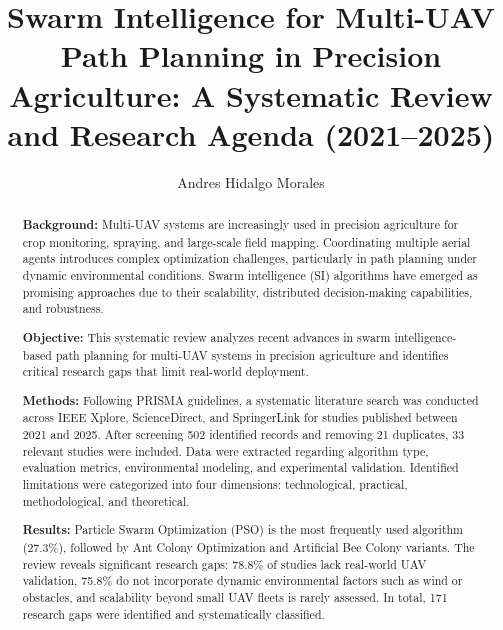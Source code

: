 \documentclass[review,3p,times]{elsarticle}
\begin{document}
\begin{frontmatter}

\title{Swarm Intelligence for Multi-UAV Path Planning in Precision Agriculture: A Systematic Review and Research Agenda (2021--2025)}

\author{\texorpdfstring{Andres Hidalgo Morales}{Andres Hidalgo Morales}}

\address{Instituto Tecnológico de Chihuahua II, Tecnológico Nacional de México, Chihuahua, México}

\begin{abstract}
\textbf{Background:} Multi-UAV systems are increasingly used in precision agriculture for crop monitoring, spraying, and large-scale field mapping. Coordinating multiple aerial agents introduces complex optimization challenges, particularly in path planning under dynamic environmental conditions. Swarm intelligence (SI) algorithms have emerged as promising approaches due to their scalability, distributed decision-making capabilities, and robustness.

\textbf{Objective:} This systematic review analyzes recent advances in swarm intelligence-based path planning for multi-UAV systems in precision agriculture and identifies critical research gaps that limit real-world deployment.

\textbf{Methods:} Following PRISMA guidelines, a systematic literature search was conducted across IEEE Xplore, ScienceDirect, and SpringerLink for studies published between 2021 and 2025. After screening 502 identified records and removing 21 duplicates, 33 relevant studies were included. Data were extracted regarding algorithm type, evaluation metrics, environmental modeling, and experimental validation. Identified limitations were categorized into four dimensions: technological, practical, methodological, and theoretical.

\textbf{Results:} Particle Swarm Optimization (PSO) is the most frequently used algorithm (27.3\%), followed by Ant Colony Optimization and Artificial Bee Colony variants. The review reveals significant research gaps: 78.8\% of studies lack real-world UAV validation, 75.8\% do not incorporate dynamic environmental factors such as wind or obstacles, and scalability beyond small UAV fleets is rarely assessed. In total, 171 research gaps were identified and systematically classified.


\end{abstract}
\end{frontmatter}
\end{document}
